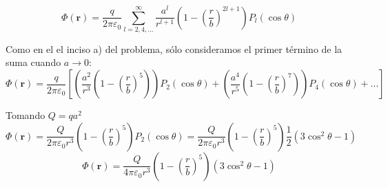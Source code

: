 \documentclass{article}
\begin{document}
\begin{equation}
    \Phi(\mathbf{r}) = \frac{q}{2\pi\varepsilon_0} \sum_{l = 2, 4, ...}^{\infty}\frac{a^l}{r^{l+1}}\left(1 - \left( \frac{r}{b}\right)^{2l+1} \right)P_l(\cos\theta)
\end{equation}

Como en el el inciso a) del problema, sólo consideramos el primer término de la suma cuando $a\to 0$:
\begin{equation}
    \Phi(\mathbf{r}) = \frac{q}{2\pi\varepsilon_0}\left[ \left(  \frac{a^2}{r^3}\left(1 - \left(\frac{r}{b} \right)^5 \right) \right )P_2(\cos\theta) + \left( \frac{a^4}{r^5} \left( 1 - \left(\frac{r}{b} \right )^{7} \right) \right)P_4(\cos\theta) + ... \right]
\end{equation}

Tomando $Q = qa^2$
\begin{equation}
    \Phi(\mathbf{r})=  \frac{Q}{2\pi\varepsilon_0 r^3} \left( 1 - \left( \frac{r}{b}\right)^5 \right)P_2(\cos\theta)   =
    \frac{Q}{2\pi\varepsilon_0 r^3} \left( 1 - \left( \frac{r}{b}\right)^5 \right)\frac{1}{2}(3\cos^2\theta -1)  
\end{equation}
\begin{equation}
    \Phi(\mathbf{r})=  \frac{Q}{4\pi\varepsilon_0 r^3} \left( 1 - \left( \frac{r}{b}\right)^5 \right)(3\cos^2\theta -1)
\end{equation}
\end{document}
